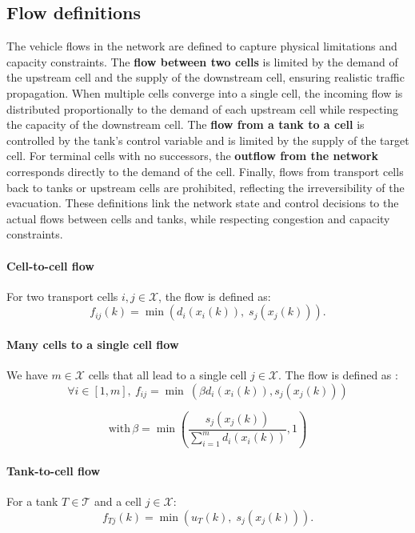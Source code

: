 \documentclass[12pt]{article}
\begin{document}
\subsection{Flow definitions}

The vehicle flows in the network are defined to capture physical limitations and capacity constraints. The \textbf{flow between two cells} is limited by the demand of the upstream cell and the supply of the downstream cell, ensuring realistic traffic propagation. When multiple cells converge into a single cell, the incoming flow is distributed proportionally to the demand of each upstream cell while respecting the capacity of the downstream cell. The \textbf{flow from a tank to a cell} is controlled by the tank’s control variable and is limited by the supply of the target cell. For terminal cells with no successors, the \textbf{outflow from the network} corresponds directly to the demand of the cell. Finally, flows from transport cells back to tanks or upstream cells are prohibited, reflecting the irreversibility of the evacuation. These definitions link the network state and control decisions to the actual flows between cells and tanks, while respecting congestion and capacity constraints\cite{ref2}\cite{ref3}.



\paragraph{Cell-to-cell flow}

For two transport cells $i,j \in \mathcal{X}$, the flow is defined as:
\[
f_{ij}(k) = \min\left(d_i(x_i(k)),\; s_j(x_j(k))\right).
\]

\paragraph{Many cells to a single cell flow}
We have $ m \in \mathcal{X}$ cells that all lead to a single cell $j \in \mathcal{X}$. The flow is defined as : 
\[
    \forall i \in [1,m],\ f_{ij} = \min\ (\beta d_i(x_i(k)),s_j(x_j(k)))
\]

\[
    \text{with} \,\beta=\min(\frac{s_j(x_j(k))}{\sum_{i=1}^{m}{d_i(x_i(k))}},1)
\]

\paragraph{Tank-to-cell flow}

For a tank $T \in \mathcal{T}$ and a cell $j \in \mathcal{X}$:
\[
f_{Tj}(k) = \min\left(u_T(k),\; s_j(x_j(k))\right).
\]
\end{document}
